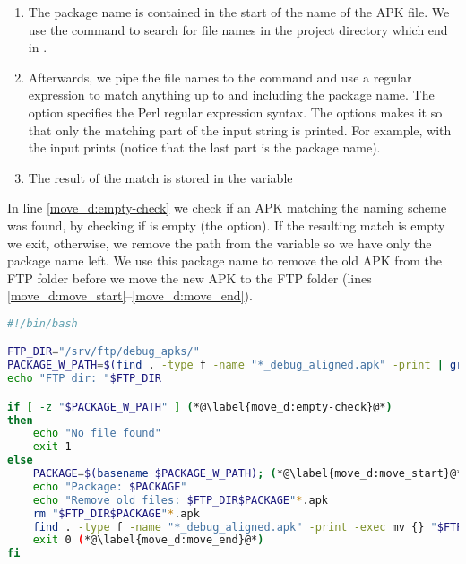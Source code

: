 \begin{enumerate}
  \item The package name is contained in the start of the name of the APK file. We use the  command to search for file names in the project directory which end in .
  \item Afterwards, we pipe the file names to the  command and use a regular expression to match anything up to and including the package name. The  option specifies the Perl regular expression syntax. The  options makes it so that only the matching part of the input string is printed. For example,  with the input  prints  (notice that the last part is the package name).
  \item The result of the match is stored in the variable 
\end{enumerate}

In line \ref{move_d:empty-check} we check if an APK matching the naming scheme was found, by checking if  is empty (the  option). If the resulting match is empty we exit, otherwise, we remove the path from the variable  so we have only the package name left. We use this package name to remove the old APK from the FTP folder before we move the new APK to the FTP folder (lines \ref{move_d:move_start}--\ref{move_d:move_end}).

\begin{lstlisting}[float=tbp,language=bash,showstringspaces=false,caption=Bash script that moves the debug APK to the FTP server,label=lst:move_debug_apk]
#!/bin/bash

FTP_DIR="/srv/ftp/debug_apks/"
PACKAGE_W_PATH=$(find . -type f -name "*_debug_aligned.apk" -print | grep ".+(?=_v.+b[0-9]+_debug_aligned\.apk)" -Po) (*@\label{move_d:package}@*)
echo "FTP dir: "$FTP_DIR

if [ -z "$PACKAGE_W_PATH" ] (*@\label{move_d:empty-check}@*)
then
    echo "No file found"
    exit 1
else
    PACKAGE=$(basename $PACKAGE_W_PATH); (*@\label{move_d:move_start}@*)
    echo "Package: $PACKAGE"
    echo "Remove old files: $FTP_DIR$PACKAGE"*.apk
    rm "$FTP_DIR$PACKAGE"*.apk
    find . -type f -name "*_debug_aligned.apk" -print -exec mv {} "$FTP_DIR" \;
    exit 0 (*@\label{move_d:move_end}@*)
fi
\end{lstlisting}

